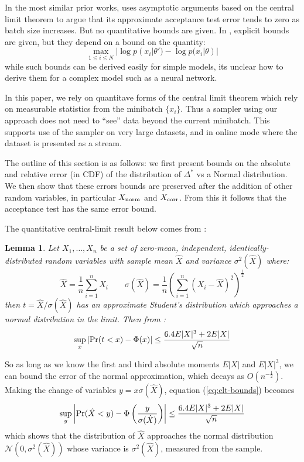 \documentclass{article}
\newtheorem{lemma}{Lemma}
\begin{document}
In the most similar prior works, \cite{cutting_mh_2014} uses asymptotic arguments based
on the central limit theorem to argue that its approximate acceptance test error tends to
zero as batch size increases. But no quantitative bounds are given. In
\cite{icml2014c1_bardenet14}, explicit bounds are given, but they depend on a bound on
the quantity:
\begin{equation}
  \max_{1\leq i\leq N}|\log p(x_i|\theta') - \log p(x_i|\theta)|
\end{equation}
while such bounds can be derived easily for simple models, its unclear how to derive them
for a complex model such as a neural network.

In this paper, we rely on quantitave forms of the central limit theorem which rely on measurable
statistics from the minibatch $\{x_i\}$. Thus a sampler using our approach does not need to ``see''
data beyond the current minibatch. This supports use of the sampler on very large datasets, and
in online mode where the dataset is presented as a stream.

The outline of this section is as follows: we first present bounds on the absolute
and relative error (in CDF) of the distribution of $\Delta^*$ vs a Normal distribution. We then show that
these errors bounds are preserved after the addition of other random variables, in particular
$X_{\rm norm}$ and $X_{\rm corr}$. From this it follows that the acceptance test has the same error bound.

The quantitative central-limit result below comes from \cite{explicit-clt05}:
  

\begin{lemma}\label{lem:quant_clt}
  Let $X_1,\ldots,X_n$ be
a set of zero-mean, independent, identically-distributed random variables with sample mean $\hat{X}$ and
variance $\sigma^2(\hat{X})$ where:
\begin{equation}
  \hat{X} = \frac{1}{n}\sum_{i=1}^nX_i \qquad   \sigma(\hat{X}) = \frac{1}{n}\left(\sum_{i=1}^n(X_i-\hat{X})^2\right)^{\frac{1}{2}}
\end{equation}
then $t=\hat{X}/\sigma(\hat{X})$ has an approximate Student's distribution which approaches a normal
distribution in the limit. Then from \cite{explicit-clt05}:
\begin{equation}\label{eq:clt-bounds}
 \sup_x|{\rm Pr}(t<x) - \Phi(x)| \leq \frac{6.4E|X|^3+2E|X|}{\sqrt{n}}
  \end{equation}
\end{lemma}

So as long as we know the first and third absolute moments $E|X|$ and $E|X|^3$, we can bound the
error of the normal approximation, which decays as $O(n^{-\frac{1}{2}})$. Making the change of variables
$y = x \sigma(\hat{X})$, equation (\ref{eq:clt-bounds}) becomes
\begin{equation}\label{eq:clt-bounds2}
   \sup_y\left|{\rm Pr}(\hat{X}< y) - \Phi\left(\frac{y}{\sigma(\hat{X})}\right)\right| \leq \frac{6.4E|X|^3+2E|X|}{\sqrt{n}}
\end{equation}
which shows that the distribution of $\hat{X}$ approaches the normal distribution $\mathcal{N}(0,\sigma^2(\hat{X}))$
whose variance is $\sigma^2(\hat{X})$, measured from the sample.
\end{document}
